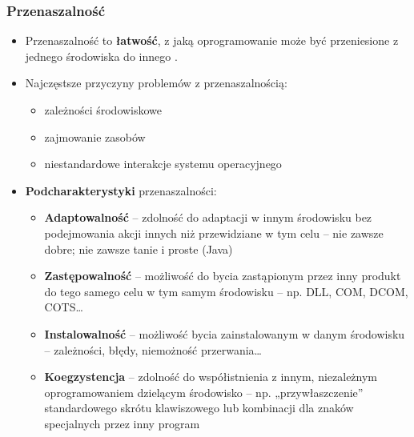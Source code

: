 \documentclass[../main.tex]{subfiles}
\begin{document}
    \subsubsection{Przenaszalność}
    \begin{itemize}
        \item Przenaszalność to \textbf{łatwość}, z jaką oprogramowanie może być przeniesione z jednego środowiska do innego .
        \item Najczęstsze przyczyny problemów z przenaszalnością:
        \begin{itemize}
            \item zależności środowiskowe
            \item zajmowanie zasobów
            \item niestandardowe interakcje systemu operacyjnego
        \end{itemize}
        \item \textbf{Podcharakterystyki} przenaszalności:
        \begin{itemize}
            \item \textbf{Adaptowalność} – zdolność do adaptacji w innym środowisku bez
            podejmowania akcji innych niż przewidziane w tym celu – nie zawsze dobre; nie zawsze tanie i proste (Java)
            \item \textbf{Zastępowalność} – możliwość do bycia zastąpionym przez inny
            produkt do tego samego celu w tym samym środowisku – np. DLL, COM, DCOM, COTS…
            \item \textbf{Instalowalność} – możliwość bycia zainstalowanym w danym środowisku
            – zależności, błędy, niemożność przerwania…
            \item \textbf{Koegzystencja} – zdolność do współistnienia z innym, niezależnym oprogramowaniem dzielącym środowisko
            – np. „przywłaszczenie” standardowego skrótu klawiszowego lub kombinacji dla znaków specjalnych przez inny program
        \end{itemize}
    \end{itemize}
\end{document}

